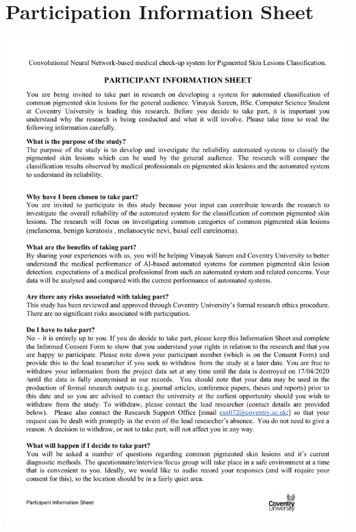 \section*{Participation Information Sheet}
\begin{center}
    \includegraphics[width=15cm]{Documents/participation.pdf}
\end{center}
